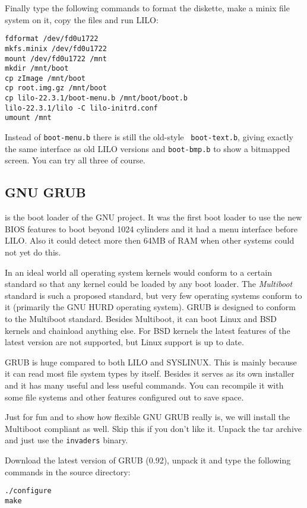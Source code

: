 \documentclass[12pt,a4paper]{article}
\begin{document}
Finally type the following commands to format the diskette, make a
minix file system on it, copy the files and run LILO:
\begin{verbatim}
fdformat /dev/fd0u1722
mkfs.minix /dev/fd0u1722
mount /dev/fd0u1722 /mnt
mkdir /mnt/boot
cp zImage /mnt/boot
cp root.img.gz /mnt/boot
cp lilo-22.3.1/boot-menu.b /mnt/boot/boot.b
lilo-22.3.1/lilo -C lilo-initrd.conf
umount /mnt
\end{verbatim}
Instead of {\tt boot-menu.b} there is still the old-style {\tt
boot-text.b}, giving exactly the same interface as old LILO versions
and {\tt boot-bmp.b} to show a bitmapped screen.  You can try all
three of course.

\subsection{GNU GRUB}

is the boot loader of the GNU project. It was the first boot loader to
use the new BIOS features to boot beyond 1024 cylinders and it had a
menu interface before LILO. Also it could detect more then 64MB of RAM
when other systems could not yet do this.

In an ideal world all operating system kernels would conform to a
certain standard so that any kernel could be loaded by any boot
loader. The {\em Multiboot} standard is such a proposed standard, but
very few operating systems conform to it (primarily the GNU HURD
operating system). GRUB is designed to conform to the Multiboot
standard. Besides Multiboot, it can boot Linux and BSD kernels and
chainload anything else. For BSD kernels the latest features of the
latest version are not supported, but Linux support is up to date.

GRUB is huge compared to both LILO and SYSLINUX. This is mainly
because it can read most file system types by itself. Besides it
serves as its own installer and it has many useful and less useful
commands. You can recompile it with some file systems and other
features configured out to save space.

Just for fun and to show how flexible GNU GRUB really is, we will
install the Multiboot compliant  as well. Skip this if you don't
like it. Unpack the tar archive and just use the {\tt invaders}
binary. 

Download the latest version of GRUB (0.92), unpack it and type the
following commands in the source directory:
\begin{verbatim}
./configure
make
\end{verbatim}
\end{document}
